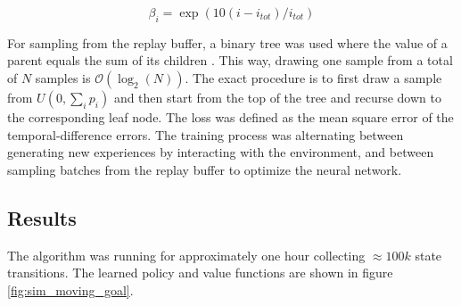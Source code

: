 \begin{equation}
    \beta_i = \exp \left( 10(i - i_{tot}) / i_{tot}\right)
\end{equation}

For sampling from the replay buffer, a binary tree was used where the value of
a parent equals the sum of its children \cite{schaul2015prioritized}. This way,
drawing one sample from a total of $N$ samples is $\mathcal{O}(\log_2(N))$. The
exact procedure is to first draw a sample from $U(0, \sum_i p_i)$ and then
start from the top of the tree and recurse down to the corresponding leaf node.
The loss was defined as the mean square error of the temporal-difference
errors. The training process was alternating between generating new experiences
by interacting with the environment, and between sampling batches from the
replay buffer to optimize the neural network.

\subsection{Results}

The algorithm was running for approximately one hour collecting $\approx 100k$
state transitions. The learned policy and value functions are shown in figure
\ref{fig:sim_moving_goal}.

